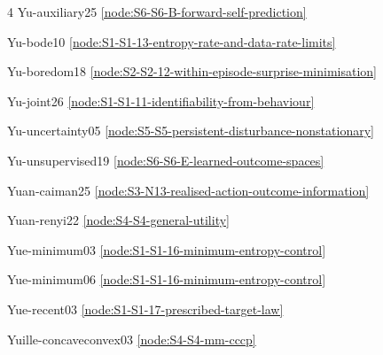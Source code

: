 \documentclass[10pt]{article}
\begin{document}
{\begin{multicols}{4}
Yu-auxiliary25 \hfill \ref{node:S6-S6-B-forward-self-prediction}\par
Yu-bode10 \hfill \ref{node:S1-S1-13-entropy-rate-and-data-rate-limits}\par
Yu-boredom18 \hfill \ref{node:S2-S2-12-within-episode-surprise-minimisation}\par
Yu-joint26 \hfill \ref{node:S1-S1-11-identifiability-from-behaviour}\par
Yu-uncertainty05 \hfill \ref{node:S5-S5-persistent-disturbance-nonstationary}\par
Yu-unsupervised19 \hfill \ref{node:S6-S6-E-learned-outcome-spaces}\par
Yuan-caiman25 \hfill \ref{node:S3-N13-realised-action-outcome-information}\par
Yuan-renyi22 \hfill \ref{node:S4-S4-general-utility}\par
Yue-minimum03 \hfill \ref{node:S1-S1-16-minimum-entropy-control}\par
Yue-minimum06 \hfill \ref{node:S1-S1-16-minimum-entropy-control}\par
Yue-recent03 \hfill \ref{node:S1-S1-17-prescribed-target-law}\par
Yuille-concaveconvex03 \hfill \ref{node:S4-S4-mm-cccp}\par


\end{multicols}}
\end{document}
